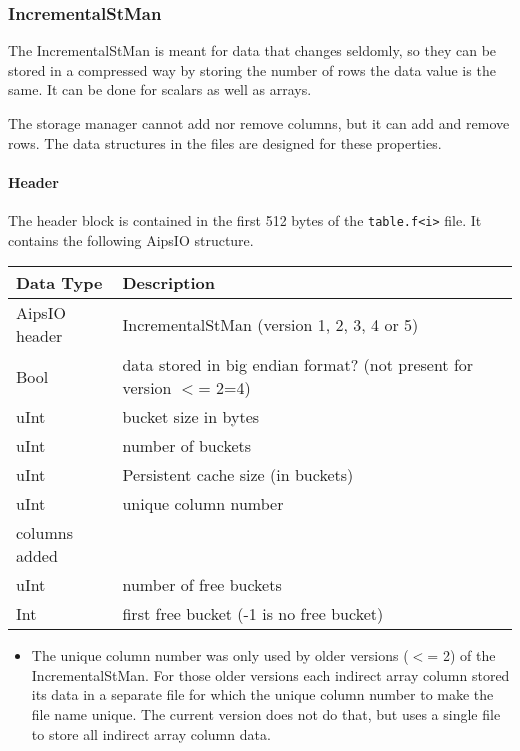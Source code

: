 \subsubsection{\label{CTDS:INCREMENTALSTMAN}IncrementalStMan}
The IncrementalStMan is meant for data that changes seldomly, so they
can be stored in a compressed way by storing the number of rows the
data value is the same. It can be done for scalars as well as arrays.

The storage manager cannot add nor remove columns, but it can add and
remove rows. The data structures in the files are designed for these properties.

\paragraph{Header\\}
The header block is contained in the first 512 bytes of the
\texttt{table.f<i>} file. It contains the following AipsIO structure.

\vspace{0.15in}
\begin{tabular}{|l|p{13cm}|} \hline
  Data Type & Description \\ \hline\hline
  AipsIO header & IncrementalStMan (version 1, 2, 3, 4 or 5) \\
  Bool & data stored in big endian format? (not present for version $<$= 2=4) \\
  uInt & bucket size in bytes \\
  uInt & number of buckets \\
  uInt & Persistent cache size (in buckets) \\
  uInt & unique column number \\
         columns added \\
  uInt & number of free buckets \\
  Int & first free bucket (-1 is no free bucket) \\
  \hline
\end{tabular}
\vspace{0.15in}

\begin{itemize}
\item
 The  unique column number was only used by older versions ($<$= 2)
 of the IncrementalStMan. For those older versions each indirect array
 column stored its data in a separate file for which the unique column
 number to make the file name unique.
The current version does not do that, but uses a single file to store
all indirect array column data.
\end{itemize}

